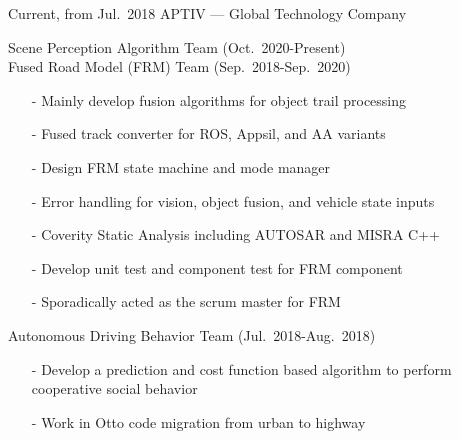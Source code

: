 \documentclass[10pt]{article} %
\begin{document}
\begin{paracol}{2}
  {Current, from Jul.~2018} %
  {APTIV --- Global Technology Company} %
  {Scene Perception Algorithm Team \hfill (Oct.~2020-Present)\smallskip\\
    Fused Road Model (FRM) Team \hfill (Sep.~2018-Sep.~2020)
    \begin{itemize}[noitemsep,nolistsep,leftmargin=5mm]
      \item[-] Mainly develop fusion algorithms for object trail processing
      \item[-] Fused track converter for ROS, Appsil, and AA variants
      \item[-] Design FRM state machine and mode manager
      \item[-] Error handling for vision, object fusion, and vehicle state inputs
      \item[-] Coverity Static Analysis including AUTOSAR and MISRA C++
      \item[-] Develop unit test and component test for FRM component
      \item[-] Sporadically acted as the scrum master for FRM
    \end{itemize}\smallskip
    Autonomous Driving Behavior Team \hfill (Jul.~2018-Aug.~2018)
    \begin{itemize}[noitemsep,nolistsep,leftmargin=5mm]
      \item[-] Develop a prediction and cost function based algorithm to perform cooperative social behavior
      \item[-] Work in Otto code migration from urban to highway
    \end{itemize}
  }



\end{paracol}
\end{document}
